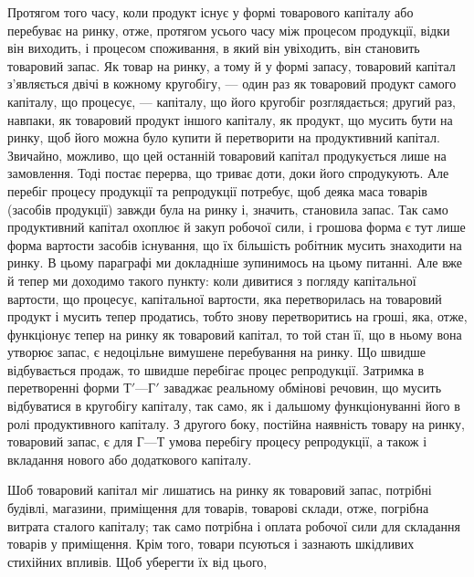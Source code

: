 Протягом того часу, коли продукт існує у формі товарового капіталу
або перебуває на ринку, отже, протягом усього часу між процесом
продукції, відки він виходить, і процесом споживання, в який він увіходить,
він становить товаровий запас. Як товар на ринку, а тому й у формі
запасу, товаровий капітал з’являється двічі в кожному кругобігу, — один
раз як товаровий продукт самого капіталу, що процесує, — капіталу, що
його кругобіг розглядається; другий раз, навпаки, як товаровий продукт
іншого капіталу, як продукт, що мусить бути на ринку, щоб його
можна було купити й перетворити на продуктивний капітал. Звичайно,
можливо, що цей останній товаровий капітал продукується лише на
замовлення. Тоді постає перерва, що триває доти, доки його спродукують.
Але перебіг процесу продукції та репродукції потребує, щоб деяка маса
товарів (засобів продукції) завжди була на ринку і, значить, становила запас.
Так само продуктивний капітал охоплює й закуп робочої сили, і грошова
форма є тут лише форма вартости засобів існування, що їх більшість робітник
мусить знаходити на ринку. В цьому параграфі ми докладніше зупинимось
на цьому питанні. Але вже й тепер ми доходимо такого пункту:
коли дивитися з погляду капітальної вартости, що процесує, капітальної
вартости, яка перетворилась на товаровий продукт і мусить тепер продатись,
тобто знову перетворитись на гроші, яка, отже, функціонує тепер на ринку
як товаровий капітал, то той стан її, що в ньому вона утворює запас, є
недоцільне вимушене перебування на ринку. Що швидше відбувається
продаж, то швидше перебігає процес репродукції. Затримка в
перетворенні форми $Т' — Г'$ заваджає реальному обмінові речовин, що
мусить відбуватися в кругобігу капіталу, так само, як і дальшому функціонуванні
його в ролі продуктивного капіталу. З другого боку, постійна
наявність товару на ринку, товаровий запас, є для $Г — Т$ умова перебігу
процесу репродукції, а також і вкладання нового або додаткового
капіталу.

Шоб товаровий капітал міг лишатись на ринку як товаровий запас,
потрібні будівлі, магазини, приміщення для товарів, товарові склади, отже,
погрібна витрата сталого капіталу; так само потрібна і оплата робочої
сили для складання товарів у приміщення. Крім того, товари псуються
і зазнають шкідливих стихійних впливів. Щоб уберегти їх від цього,
\parbreak{}  %
